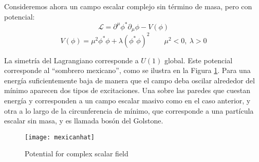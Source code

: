 \begin{frame}
Consideremos ahora un campo escalar complejo sin término de masa, pero con potencial:
\begin{equation}
  \label{eq:85qft}
  \mathcal{L}=\partial^\mu\phi^*\partial_\mu\phi-V(\phi)
\end{equation}
\begin{equation}
  V(\phi)=\mu^2\phi^*\phi+\lambda(\phi^*\phi)^2 
  \qquad 
  \mu^2\lt 0,\ \lambda\gt 0 
\end{equation}
\end{frame}
La simetría del Lagrangiano corresponde a $U(1)$ global. Este potencial corresponde al ``sombrero mexicano'', como se ilustra en la Figura \ref{fig:mexicanhat}. Para una energía suficientemente baja de manera que el campo deba oscilar alrededor del mínimo aparecen dos tipos de excitaciones. Una sobre las paredes  que cuestan energía y corresponden a un campo escalar masivo como en el caso anterior, y otra a lo largo de la circunferencia de mínimo, que corresponde a una partícula escalar sin masa, y es llamada bosón del Golstone. 

\begin{frame}



\begin{figure}
  \centering
  \texttt{[image: mexicanhat]}
  \caption{Potential for complex scalar field}
  \label{fig:mexicanhat}
\end{figure}

\end{frame}


